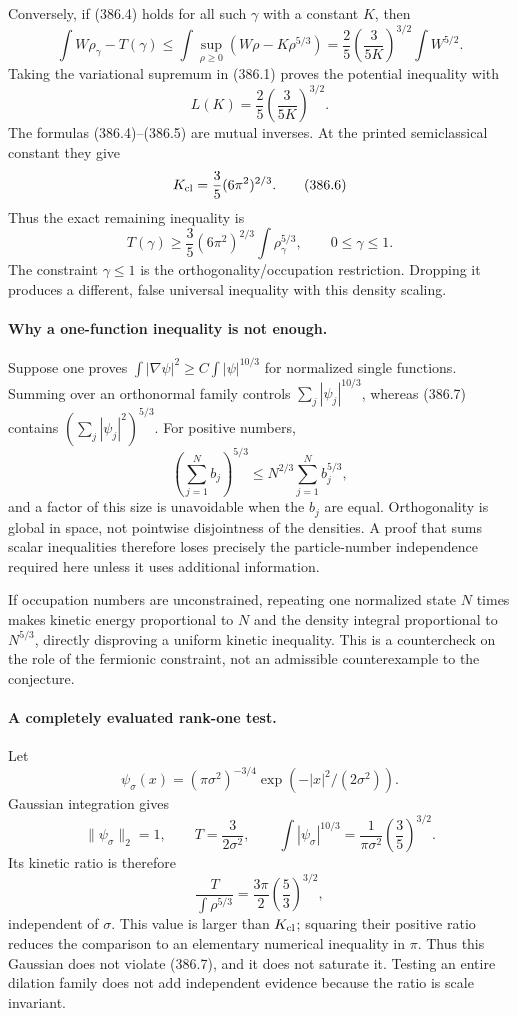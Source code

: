 \documentclass[11pt]{article}
\begin{document}
Conversely, if (386.4) holds for all such $\gamma$ with a constant
$K$, then
\[
 \int W\rho_\gamma-T(\gamma)
 \leq\int\sup_{\rho\geq0}(W\rho-K\rho^{5/3})
 =\frac25\left(\frac3{5K}\right)^{3/2}\int W^{5/2}.
\]
Taking the variational supremum in (386.1) proves the potential
inequality with
\[
 L(K)=\frac25\left(\frac3{5K}\right)^{3/2}.
 \tag{386.5}
\]
The formulas (386.4)--(386.5) are mutual inverses. At the printed
semiclassical constant they give
\[
 K_{\rm cl}=\frac35(6\pi^2)^{2/3}.
 \tag{386.6}
\]
Thus the exact remaining inequality is
\[
 \boxed{\ T(\gamma)\geq\frac35(6\pi^2)^{2/3}
                    \int\rho_\gamma^{5/3},\qquad0\leq\gamma\leq1.\ }
 \tag{386.7}
\]
The constraint $\gamma\leq1$ is the orthogonality/occupation
restriction. Dropping it produces a different, false universal
inequality with this density scaling.

\paragraph{Why a one-function inequality is not enough.}
Suppose one proves $\int|\nabla\psi|^2\geq C\int|\psi|^{10/3}$
for normalized single functions. Summing over an orthonormal family
controls $\sum_j|\psi_j|^{10/3}$, whereas (386.7) contains
$(\sum_j|\psi_j|^2)^{5/3}$. For positive numbers,
\[
 \left(\sum_{j=1}^N b_j\right)^{5/3}
       \leq N^{2/3}\sum_{j=1}^N b_j^{5/3},
\]
and a factor of this size is unavoidable when the $b_j$ are equal.
Orthogonality is global in space, not pointwise disjointness of the
densities. A proof that sums scalar inequalities therefore loses
precisely the particle-number independence required here unless it
uses additional information.

If occupation numbers are unconstrained, repeating one normalized
state $N$ times makes kinetic energy proportional to $N$ and the
density integral proportional to $N^{5/3}$, directly disproving a
uniform kinetic inequality. This is a countercheck on the role of
the fermionic constraint, not an admissible counterexample to the
conjecture.

\paragraph{A completely evaluated rank-one test.}
Let
\[
 \psi_\sigma(x)=(\pi\sigma^2)^{-3/4}
                 \exp(-|x|^2/(2\sigma^2)).
\]
Gaussian integration gives
\[
 \|\psi_\sigma\|_2=1,\qquad
 T=\frac3{2\sigma^2},\qquad
 \int|\psi_\sigma|^{10/3}
       =\frac1{\pi\sigma^2}\left(\frac35\right)^{3/2}.
\]
Its kinetic ratio is therefore
\[
 \frac{T}{\int\rho^{5/3}}
       =\frac{3\pi}{2}\left(\frac53\right)^{3/2},
 \tag{386.8}
\]
independent of $\sigma$. This value is larger than $K_{\rm cl}$;
squaring their positive ratio reduces the comparison to an elementary
numerical inequality in $\pi$. Thus this Gaussian does not violate
(386.7), and it does not saturate it. Testing an entire dilation
family does not add independent evidence because the ratio is
scale invariant.
\end{document}
